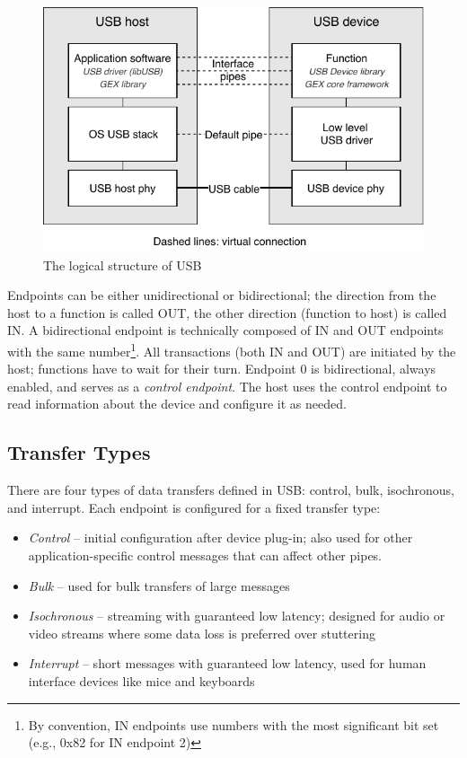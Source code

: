 \begin{figure}[h]
	\centering
	\includegraphics[scale=1] {img/usb-logical-redraw.pdf}
	\caption{\label{fig:usb_logical}The logical structure of USB}
\end{figure}

Endpoints can be either unidirectional or bidirectional; the direction from the host to a function is called OUT, the other direction (function to host) is called IN. A bidirectional endpoint is technically composed of IN and OUT endpoints with the same number\footnote{By convention, IN endpoints use numbers with the most significant bit set (e.g., 0x82 for IN endpoint 2)}. All transactions (both IN and OUT) are initiated by the host; functions have to wait for their turn. Endpoint 0 is bidirectional, always enabled, and serves as a \textit{control endpoint}. The host uses the control endpoint to read information about the device and configure it as needed.

\subsection{Transfer Types}

There are four types of data transfers defined in \gls{USB}: control, bulk, isochronous, and interrupt. Each endpoint is configured for a fixed transfer type:

\begin{itemize}
	\item \textit{Control} -- initial configuration after device plug-in; also used for other application-specific control messages that can affect other pipes.
	\item \textit{Bulk} -- used for bulk transfers of large messages
	\item \textit{Isochronous} -- streaming with guaranteed low latency; designed for audio or video streams where some data loss is preferred over stuttering
	\item \textit{Interrupt} -- short messages with guaranteed low latency, used for human interface devices like mice and keyboards
\end{itemize}

